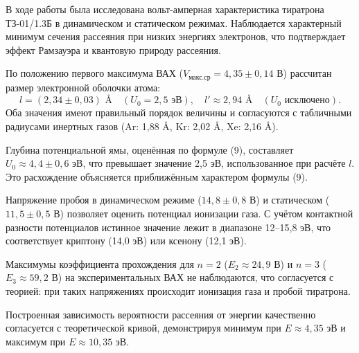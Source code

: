 \documentclass[12pt,a4paper]{article}
\begin{document}
В ходе работы была исследована вольт-амперная характеристика тиратрона ТЗ-01/1.3Б в динамическом и статическом режимах. Наблюдается характерный минимум сечения рассеяния при низких энергиях электронов, что подтверждает эффект Рамзауэра и квантовую природу рассеяния.

По положению первого максимума ВАХ ($V_{\text{макс.ср}} = 4,35 \pm 0,14$ В) рассчитан размер электронной оболочки атома:
\begin{equation}
    l = (2,34 \pm 0,03) \text{ \AA} \quad (U_0 = 2,5 \text{ эВ}), \quad l' \approx 2,94 \text{ \AA} \quad (U_0 \text{ исключено}).
\end{equation}
Оба значения имеют правильный порядок величины и согласуются с табличными радиусами инертных газов (Ar: 1,88 \AA, Kr: 2,02 \AA, Xe: 2,16 \AA).

Глубина потенциальной ямы, оценённая по формуле (9), составляет $U_0 \approx 4,4 \pm 0,6$ эВ, что превышает значение 2,5 эВ, использованное при расчёте $l$. Это расхождение объясняется приближённым характером формулы (9).

Напряжение пробоя в динамическом режиме ($14,8 \pm 0,8$ В) и статическом ($11,5 \pm 0,5$ В) позволяет оценить потенциал ионизации газа. С учётом контактной разности потенциалов истинное значение лежит в диапазоне 12--15,8 эВ, что соответствует криптону (14,0 эВ) или ксенону (12,1 эВ).

Максимумы коэффициента прохождения для $n = 2$ ($E_2 \approx 24,9$ В) и $n = 3$ ($E_3 \approx 59,2$ В) на экспериментальных ВАХ не наблюдаются, что согласуется с теорией: при таких напряжениях происходит ионизация газа и пробой тиратрона.

Построенная зависимость вероятности рассеяния от энергии качественно согласуется с теоретической кривой, демонстрируя минимум при $E \approx 4,35$ эВ и максимум при $E \approx 10,35$ эВ.
\end{document}
